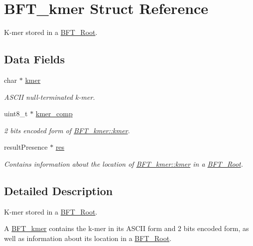 \hypertarget{structBFT__kmer}{}\section{B\+F\+T\+\_\+kmer Struct Reference}
\label{structBFT__kmer}


K-\/mer stored in a \hyperlink{structBFT__Root}{B\+F\+T\+\_\+\+Root}.  


\subsection*{Data Fields}
\begin{DoxyCompactItemize}
\item 
char $\ast$ \hyperlink{structBFT__kmer_ae4cf6766f01ebfa54fe51d0e60bec942}{kmer}
\begin{DoxyCompactList}\small\item\em A\+S\+C\+I\+I null-\/terminated k-\/mer. \end{DoxyCompactList}\item 
uint8\+\_\+t $\ast$ \hyperlink{structBFT__kmer_a9935a78617deffcf7a24fcca0143962c}{kmer\+\_\+comp}
\begin{DoxyCompactList}\small\item\em 2 bits encoded form of \hyperlink{structBFT__kmer_ae4cf6766f01ebfa54fe51d0e60bec942}{B\+F\+T\+\_\+kmer\+::kmer}. \end{DoxyCompactList}\item 
result\+Presence $\ast$ \hyperlink{structBFT__kmer_aab6ab4e17d069ebb9e5c467d8fee5002}{res}
\begin{DoxyCompactList}\small\item\em Contains information about the location of \hyperlink{structBFT__kmer_ae4cf6766f01ebfa54fe51d0e60bec942}{B\+F\+T\+\_\+kmer\+::kmer} in a \hyperlink{structBFT__Root}{B\+F\+T\+\_\+\+Root}. \end{DoxyCompactList}\end{DoxyCompactItemize}


\subsection{Detailed Description}
K-\/mer stored in a \hyperlink{structBFT__Root}{B\+F\+T\+\_\+\+Root}. 

A \hyperlink{structBFT__kmer}{B\+F\+T\+\_\+kmer} contains the k-\/mer in its A\+S\+C\+I\+I form and 2 bits encoded form, as well as information about its location in a \hyperlink{structBFT__Root}{B\+F\+T\+\_\+\+Root}. 

